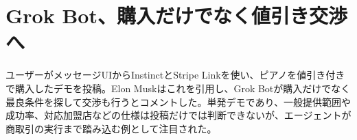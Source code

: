 \section{Grok Bot、購入だけでなく値引き交渉へ}
ユーザーがメッセージUIからInstinctとStripe Linkを使い、ピアノを値引き付きで購入したデモを投稿。Elon Muskはこれを引用し、Grok Botが購入だけでなく最良条件を探して交渉も行うとコメントした。単発デモであり、一般提供範囲や成功率、対応加盟店などの仕様は投稿だけでは判断できないが、エージェントが商取引の実行まで踏み込む例として注目された。
